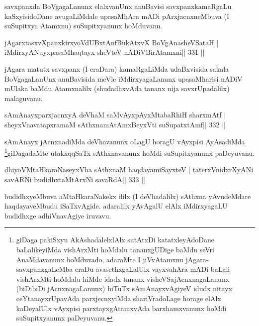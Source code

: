 \begin{artha}
savxpanxda BoVgagaLanunx elalxvanUnx anuBavisi savxpanxkamaRgaLu  kaSxyisidoDane avugaLiMdale upasaMhAra mADi pArxjacnxneMbuva (I suSupitxya Atamxnu) suSupitxyanunx hoMduvanu.
\end{artha}


\begin{shl}
jAgarxtasxvXpanxkirxyoVdUBxtAnfBukAtxvX BoVgAnasheVSataH |
iMdirxyANuyxpasaMhaqtayx sheVteV nADiVBirAtamxni\hfill || 331 ||
\end{shl}

\begin{artha}
jAgara matutx savxpanx (I eraDara) kamaRgaLiMda udaBxvisida sakala BoVgagaLanUnx anuBavisida meVle iMdirxyagaLanunx upasaMharisi nADiV mUlaka baMdu Atamxnalilx (shudadhxvAda tananx nija savxrUpadalilx) malaguvanu.
\end{artha}

\begin{shl}
sAmAnayxparxjacnxyA deVhaM saMvAyxpAyxMtabaRhiH sharxmAtf |
sheyxVnavatapxramaM sAthxnamAtAmx\s BeyxVti suSupatxtAmf\hfill || 332 ||
\end{shl}

\begin{artha}
sAmAnayx jAcnxnadiMda deVhavanunx oLagU horagU vAyxpisi AyAsadiMda 
\footnote[1]{giDaga pakiSxyu AkAshadalelxlAlx sutAtxDi katatxleyAdoDane 
baLalikeyiMda vishArxMti hoMdalu tananxgUDige baMdu seVri AnaMdavanunx 
hoMduvado, adaraMte I jiVvAtamxnu jAgara-savxpanxgaLeMba eraDu avasethxgaLalUlx vayxvahAra mADi baLali vishArxMti hoMdalu hiMde idadx tananx visheVSajAcnxnagaLanunx (biDibiDi jAcnxnagaLanunx) biTuTx sAmAnayxvAgiyeV idudx nitayx ceYtanayxrUpavAda parxjecnxyiMda shariVradoLage horage elAlx kaDeyalUlx vAyxpisi parxtayxgAtamxvAda barxhamxvanunx hoMdi suSupitxyanunx paDeyuvanu.}giDagadaMte utakxqqSaTx sAthxnavanunx hoMdi suSupitxyanunx paDeyuvanu.
\end{artha}

\begin{shl}
dhiyoV\s MtaHkaraNaseyxVha sAthxnaM haqdayamiSayxteV |
taterxVnidxrXyANi savARNi budidhxtaMtArxNi savaRdA\hfill || 333 ||
\end{shl}

\begin{artha}
budidhxyeMbuva aMtaHkaraNakekx ililx (I deVhadalilx) sAthxna  yAvudeMdare haqdayaveMbudu iSaTxvAgide. adaralilx yAvAgalU elAlx iMdirxyagaLU budidhxge adhiVnavAgiye iruvavu.
\end{artha}

